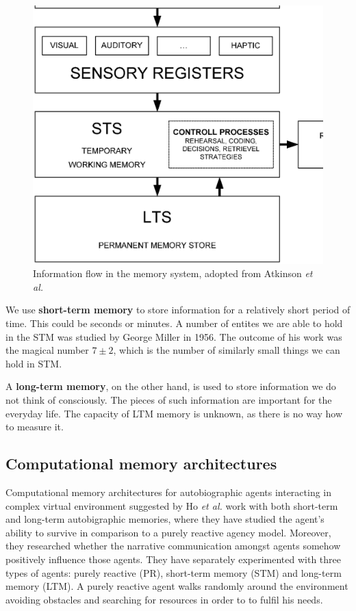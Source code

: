 \begin{figure}
  \centering                                
  \includegraphics[scale=0.5]{diagrams/usedalgorithms/atkinson-memory.eps}    
  \caption{Information flow in the memory system, adopted from Atkinson \textit{et al.} \cite{Atkinson:controlofrtm}}
  \label{usedalgorithms:qttv}
\end{figure}

We use {\bf short-term memory} to store information for a relatively short period of time. This could be seconds or minutes. A number of entites we are able to hold in the STM was studied by George Miller in 1956. \cite{Sternberg:congitivepsychology} The outcome of his work was the magical number $7\pm 2$, which is the number of similarly small things we can hold in STM.

A \textbf{long-term memory}, on the other hand, is used to store information we do not think of consciously. The pieces of such information are important for the everyday life. The capacity of LTM memory is unknown, as there is no way how to measure it. 
                                               
\subsection{Computational memory architectures}

Computational memory architectures for autobiographic agents interacting in complex virtual environment suggested by Ho \textit{et al.} work with both short-term and long-term autobigraphic memories, where they have studied the agent’s ability to survive in comparison to a purely reactive agency model. \cite{Ho:memoryarchitectures} Moreover, they researched whether the narrative communication amongst agents somehow positively influence those agents. They have separately experimented with three types of agents: purely reactive (PR), short-term memory (STM) and long-term memory (LTM). A purely reactive agent walks randomly around the environment avoiding obstacles and searching for resources in order to to fulfil his needs.

